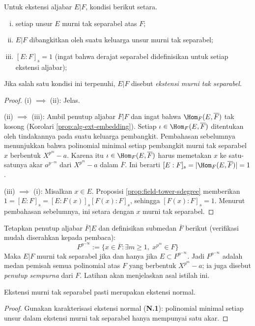 \begin{definition-theorem}\label{def:pins}
	Untuk ekstensi aljabar $E|F$, kondisi berikut setara.
	\begin{enumerate}[(i)]
		\item setiap unsur $E$ murni tak separabel atas $F$;
		\item $E|F$ dibangkitkan oleh suatu keluarga unsur murni tak separabel;
		\item $[E:F]_s = 1$ (ingat bahwa derajat separabel didefinisikan untuk setiap ekstensi aljabar);
	\end{enumerate}
	Jika salah satu kondisi ini terpenuhi, $E|F$ disebut \emph{ekstensi murni tak separabel}.
\end{definition-theorem}
\begin{proof}
	(i) $\implies$ (ii): Jelas.

	(ii) $\implies$ (iii): Ambil penutup aljabar $\overline{F}|F$ dan ingat bahwa $\Hom_F(E, \overline{F})$ tak kosong (Korolari \ref{prop:alg-ext-embedding}). Setiap $\iota \in \Hom_F(E, \overline{F})$ ditentukan oleh tindakannya pada suatu keluarga pembangkit. Pembahasan sebelumnya menunjukkan bahwa polinomial minimal setiap pembangkit murni tak separabel $x$ berbentuk $X^{p^m} - a$. Karena itu $\iota \in \Hom_F(E, \overline{F})$ harus memetakan $x$ ke satu-satunya akar $a^{p^{-m}}$ dari $X^{p^m} - a$ dalam $\overline{F}$. Ini berarti $[E:F]_s = |\Hom_F(E, \overline{F})| = 1$.
	
	(iii) $\implies$ (i): Misalkan $x \in E$. Proposisi \ref{prop:field-tower-sdegree} memberikan $1 = [E:F]_s = [E:F(x)]_s [F(x):F]_s$, sehingga $[F(x):F]_s = 1$. Menurut pembahasan sebelumnya, ini setara dengan $x$ murni tak separabel.
\end{proof}

Tetapkan penutup aljabar $\overline{F}|E$ dan definisikan submedan $\overline{F}$ berikut (verifikasi mudah diserahkan kepada pembaca):
\[ F^{p^{-\infty}} := \{ x \in \overline{F}: \exists m \geq 1,\; x^{p^m} \in F \}  \]
Maka $E|F$ murni tak separabel jika dan hanya jika $E \subset F^{p^{-\infty}}$. Jadi $F^{p^{-\infty}}$ adalah medan pemisah semua polinomial atas $F$ yang berbentuk $X^{p^m}-a$; ia juga disebut \emph{penutup sempurna} dari $F$. Latihan akan menjelaskan asal istilah ini.

\begin{lemma}
	Ekstensi murni tak separabel pasti merupakan ekstensi normal.
\end{lemma}
\begin{proof}
	Gunakan karakterisasi ekstensi normal (\textbf{N.1}): polinomial minimal setiap unsur dalam ekstensi murni tak separabel hanya mempunyai satu akar.
\end{proof}

